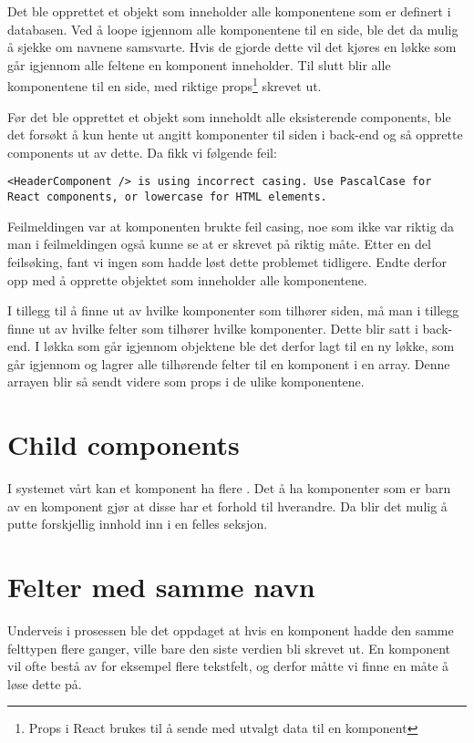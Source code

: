 Det ble opprettet et objekt som inneholder alle komponentene som er definert i databasen. Ved å loope igjennom alle komponentene til en side, ble det da mulig å sjekke om navnene samsvarte. Hvis de gjorde dette vil det kjøres en løkke som går igjennom alle feltene en komponent inneholder. Til slutt blir alle komponentene til en side, med riktige props\footnote{Props i React brukes til å sende med utvalgt data til en komponent} skrevet ut.  

Før det ble opprettet et objekt som inneholdt alle eksisterende components, ble det forsøkt å kun hente ut angitt komponenter til siden i back-end og så opprette components ut av dette. Da fikk vi følgende feil:
\begin{lstlisting}
<HeaderComponent /> is using incorrect casing. Use PascalCase for React components, or lowercase for HTML elements.
\end{lstlisting}

Feilmeldingen var at komponenten brukte feil casing, noe som ikke var riktig da man i feilmeldingen også kunne se at  er skrevet på riktig måte. Etter en del feilsøking, fant vi ingen som hadde løst dette problemet tidligere. Endte derfor opp med å opprette objektet som inneholder alle komponentene. 

I tillegg til å finne ut av hvilke komponenter som tilhører siden, må man i tillegg finne ut av hvilke felter som tilhører hvilke komponenter. Dette blir satt i back-end. I løkka som går igjennom objektene ble det derfor lagt til en ny løkke, som går igjennom og lagrer alle tilhørende felter til en komponent i en array. Denne arrayen blir så sendt videre som props i de ulike komponentene.

\section{Child components}
I systemet vårt kan et komponent ha flere . Det å ha komponenter som er barn av en komponent gjør at disse har et forhold til hverandre. Da blir det mulig å putte forskjellig innhold inn i en felles seksjon.

\section{Felter med samme navn}
Underveis i prosessen ble det oppdaget at hvis en komponent hadde den samme felttypen flere ganger, ville bare den siste verdien bli skrevet ut. En komponent vil ofte bestå av for eksempel flere tekstfelt, og derfor måtte vi finne en måte å løse dette på.

